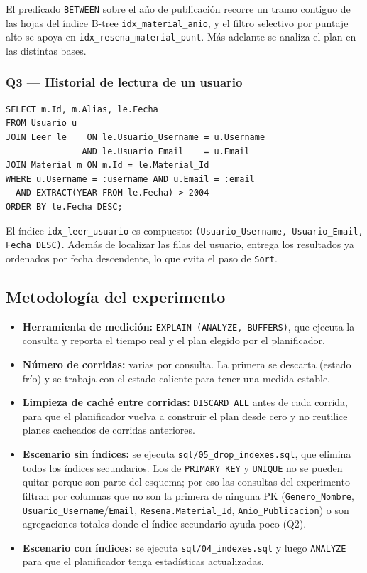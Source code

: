 \documentclass[12pt,a4paper]{article}
\begin{document}
El predicado \texttt{BETWEEN} sobre el año de publicación recorre un tramo
contiguo de las hojas del índice B-tree \texttt{idx\_material\_anio}, y el
filtro selectivo por puntaje alto se apoya en \texttt{idx\_resena\_material\_punt}.
Más adelante se analiza el plan en las distintas bases.


\subsubsection*{Q3 --- Historial de lectura de un usuario}

\begin{lstlisting}
SELECT m.Id, m.Alias, le.Fecha
FROM Usuario u
JOIN Leer le    ON le.Usuario_Username = u.Username
               AND le.Usuario_Email    = u.Email
JOIN Material m ON m.Id = le.Material_Id
WHERE u.Username = :username AND u.Email = :email
  AND EXTRACT(YEAR FROM le.Fecha) > 2004
ORDER BY le.Fecha DESC;
\end{lstlisting}

El índice \texttt{idx\_leer\_usuario} es compuesto:
\texttt{(Usuario\_Username, Usuario\_Email, Fecha DESC)}. Además de
localizar las filas del usuario, entrega los resultados ya ordenados
por fecha descendente, lo que evita el paso de \texttt{Sort}.
\subsection{Metodología del experimento}

\begin{itemize}
  \item \textbf{Herramienta de medición:} \texttt{EXPLAIN (ANALYZE,
  BUFFERS)}, que ejecuta la consulta y reporta el tiempo real y el plan
  elegido por el planificador.

  \item \textbf{Número de corridas:} varias por consulta. La primera se
  descarta (estado frío) y se trabaja con el estado caliente para tener una
  medida estable.

  \item \textbf{Limpieza de caché entre corridas:} \texttt{DISCARD ALL}
  antes de cada corrida, para que el planificador vuelva a construir el
  plan desde cero y no reutilice planes cacheados de corridas anteriores.

  \item \textbf{Escenario sin índices:} se ejecuta \texttt{sql/05\_drop\_indexes.sql},
  que elimina todos los índices secundarios. Los de \texttt{PRIMARY KEY} y
  \texttt{UNIQUE} no se pueden quitar porque son parte del esquema; por eso
  las consultas del experimento filtran por columnas que no son la primera
  de ninguna PK (\texttt{Genero\_Nombre},
  \texttt{Usuario\_Username}/\texttt{Email}, \texttt{Resena.Material\_Id},
  \texttt{Anio\_Publicacion}) o son agregaciones totales donde el índice
  secundario ayuda poco (Q2).

  \item \textbf{Escenario con índices:} se ejecuta \texttt{sql/04\_indexes.sql}
  y luego \texttt{ANALYZE} para que el planificador tenga estadísticas
  actualizadas.
\end{itemize}
\end{document}

